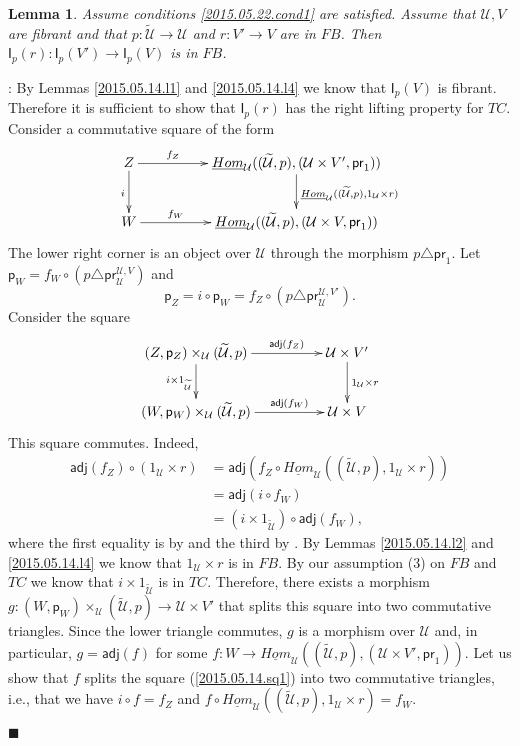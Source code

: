 \documentclass[12pt]{article}
\numberwithin{equation}{section}
\newenvironment{eq}{\begin{equation}}{\end{equation}}
\newenvironment{myproof}{{\bf Proof}:}{$\blacksquare$ \vskip 5mm }
\newtheorem{lemma}[proposition]{Lemma}
\newcommand{\sr}{\rightarrow}
\newcommand{\uu}{\underline}
\newcommand{\iHom}{\uu{Hom}}
\newcommand{\wt}{\widetilde}
\newcommand{\id}{1}            %
\newcommand{\p}{\mathsf{p}}
\newcommand{\U}{\mathcal{U}}
\newcommand{\I}{\mathsf{I}}
\newcommand{\pr}{\mathsf{pr}}
\newcommand{\adj}{\mathsf{adj}}
\begin{document}
%
\begin{lemma}
  \label{2015.05.14.l3}
  Assume conditions \ref{2015.05.22.cond1} are satisfied.
  Assume that $\U,V$ are fibrant and that $p:\wt{\U}\sr \U$
  and $r:V'\sr V$ are in $FB$. Then $\I_p(r):\I_p(V')\sr \I_p(V)$ is in $FB$.
\end{lemma}
%
\begin{myproof}
By Lemmas \ref{2015.05.14.l1} and \ref{2015.05.14.l4} we know that $\I_p(V)$ is
fibrant. Therefore it is sufficient to show that $\I_p(r)$ has the right lifting
property for $TC$. Consider a commutative square of the form
%
\begin{eq}
\label{2015.05.14.sq1}
\begin{xy}
          \xymatrix@C=4pc{ Z \ar[r]^-{f_Z} \ar[d]_{i} &
            \iHom_\U((\wt{\U},p),(\U\times V',\pr_1))
            \ar[d]^{\iHom_\U((\wt{\U},p), \id_\U\times r)}\\ W \ar[r]^-{f_W} &
            \iHom_\U((\wt{\U},p), (\U\times V, \pr_1)) }
\end{xy}
\end{eq}%
%
The lower right corner is an object over $\U$ through the morphism $p\triangle
\pr_1$. Let $\p_W=f_W\circ (p\triangle \pr^{\U,V}_\U)$ and
%
\[ \p_Z=i\circ \p_W=f_Z\circ (p\triangle \pr^{\U,V'}_\U) . \]
%
Consider the square
%
\begin{eq}
\label{2015.05.14.sq2}
\begin{xy}
          \xymatrix@C=4pc{ (Z,\p_Z)\times_\U (\wt{\U},p) \ar[r]^-{\adj(f_Z)}
            \ar[d]_{i\times \id_{\wt{\U}}} & \U\times V' \ar[d]^{\id_\U\times
              r}\\ (W,\p_W)\times_\U (\wt{\U},p) \ar[r]^-{\adj(f_W)} & \U\times V }
\end{xy}
\end{eq}%
%
This square commutes. Indeed,
%
\begin{align*}
  \adj(f_Z)\circ (\id_\U\times r )
  & = \adj(f_Z\circ \iHom_\U((\wt{\U},p), \id_\U\times r)) \\
  & = \adj(i\circ f_W) \\
  & = (i\times \id_{\wt{\U}})\circ \adj (f_W),
\end{align*}
%
where the first equality is by \cite[Lemma 8.7(1)]{fromunivwithPi} and the
third by \cite[Lemma 8.7(3)]{fromunivwithPi}. By Lemmas \ref{2015.05.14.l2} and
\ref{2015.05.14.l4} we know that $\id_\U\times r$ is in $FB$. By our assumption
(3) on $FB$ and $TC$ we know that $i\times \id_{\wt{\U}}$ is in $TC$. Therefore,
there exists a morphism $g:(W,\p_W)\times_\U (\wt{\U},p) \sr \U\times V'$ that
splits this square into two commutative triangles. Since the lower triangle
commutes, $g$ is a morphism over $\U$ and, in particular, $g=\adj(f)$ for some
$f:W\sr \iHom_\U((\wt{\U},p),(\U\times V',\pr_1))$. Let us show that $f$ splits
the square (\ref{2015.05.14.sq1}) into two commutative triangles, i.e., that we
have $i\circ f= f_Z$ and $f\circ \iHom_\U((\wt{\U},p), \id_\U\times r)=f_W$.


\end{myproof}
\end{document}
